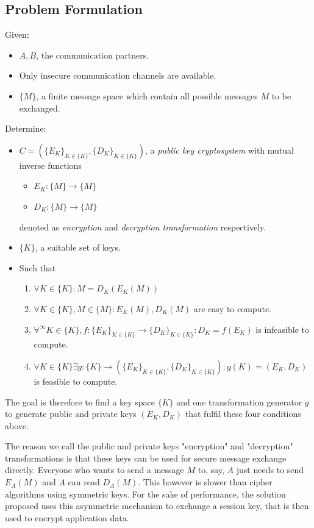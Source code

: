 \documentclass[paper=a4, fontsize=11pt]{scrartcl} %
\numberwithin{equation}{section} %
\numberwithin{figure}{section} %
\numberwithin{table}{section} %
\begin{document}
\subsection{Problem Formulation}
Given:
\begin{itemize}
	\item $A, B$, the communication partners.
	\item Only insecure communication channels are available.
	\item $\{M\}$, a finite message space which contain all possible messages $M$ to be exchanged.
\end{itemize}
Determine:
\begin{itemize}
	\item $C = (\{E_K\}_{K\in\{K\}}, \{D_K\}_{K\in\{K\}})$, a \textit{public key cryptosystem} with mutual inverse functions
	\begin{itemize}
		\item $E_K:\{M\}\rightarrow\{M\}$
		\item $D_K:\{M\}\rightarrow\{M\}$
	\end{itemize}
	denoted as \textit{encryption} and \textit{decryption transformation} respectively.
	\item $\{K\}$, a suitable set of keys.
	\item Such that
	\begin{enumerate}
	\item $\forall K\in\{K\}:M = D_K(E_K(M))$
	\item $\forall K\in\{K\},M\in\{M\}:E_K(M), D_K(M)$ are easy to compute.
	\item $\forall^\infty K\in\{K\},f:\{E_K\}_{K\in\{K\}}\rightarrow \{D_K\}_{K\in\{K\}}:D_K = f(E_K)$ is infeasible to compute.
	\item $\forall K\in\{K\}\exists g:\{K\}\rightarrow(\{E_K\}_{K\in\{K\}}, \{D_K\}_{K\in\{K\}}):g(K) = (E_K,D_K)$ is feasible to compute.
	\end{enumerate}
\end{itemize}
The goal is therefore to find a key space $\{K\}$ and one transformation generator $g$ to generate public and private keys $(E_K,D_K)$ that fulfil these four conditions above.

The reason we call the public and private keys "encryption" and "decryption" transformations is that these keys can be used for secure message exchange directly. Everyone who wants to send a message $M$ to, say, $A$ just needs to send $E_A(M)$ and $A$ can read $D_A(M)$. This however is slower than cipher algorithms using symmetric keys. For the sake of performance, the solution proposed uses this asymmetric mechanism to exchange a session key, that is then used to encrypt application data.
\end{document}
